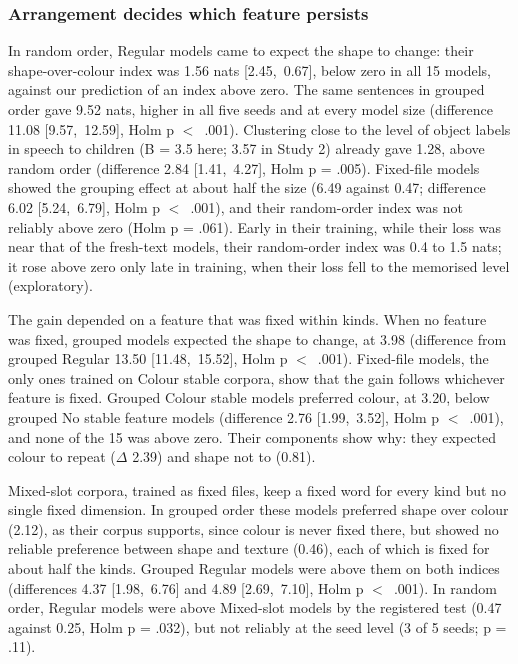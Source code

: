 \subsubsection*{Arrangement decides which feature persists}
In random order, Regular models came to expect the shape to change: their shape-over-colour index was \textminus{}1.56 nats [\textminus{}2.45,~\textminus{}0.67], below zero in all 15 models, against our prediction of an index above zero. The same sentences in grouped order gave 9.52 nats, higher in all five seeds and at every model size (difference 11.08 [9.57,~12.59], Holm p $<$~.001). Clustering close to the level of object labels in speech to children (B = 3.5 here; 3.57 in Study 2) already gave 1.28, above random order (difference 2.84 [1.41,~4.27], Holm p = .005). Fixed-file models showed the grouping effect at about half the size (6.49 against 0.47; difference 6.02 [5.24,~6.79], Holm p $<$~.001), and their random-order index was not reliably above zero (Holm p = .061). Early in their training, while their loss was near that of the fresh-text models, their random-order index was \textminus{}0.4 to \textminus{}1.5 nats; it rose above zero only late in training, when their loss fell to the memorised level (exploratory).

The gain depended on a feature that was fixed within kinds. When no feature was fixed, grouped models expected the shape to change, at \textminus{}3.98 (difference from grouped Regular 13.50 [11.48,~15.52], Holm p $<$~.001). Fixed-file models, the only ones trained on Colour stable corpora, show that the gain follows whichever feature is fixed. Grouped Colour stable models preferred colour, at \textminus{}3.20, below grouped No stable feature models (difference 2.76 [1.99,~3.52], Holm p $<$~.001), and none of the 15 was above zero. Their components show why: they expected colour to repeat ($\Delta$ 2.39) and shape not to (\textminus{}0.81).

Mixed-slot corpora, trained as fixed files, keep a fixed word for every kind but no single fixed dimension. In grouped order these models preferred shape over colour (2.12), as their corpus supports, since colour is never fixed there, but showed no reliable preference between shape and texture (0.46), each of which is fixed for about half the kinds. Grouped Regular models were above them on both indices (differences 4.37 [1.98,~6.76] and 4.89 [2.69,~7.10], Holm p $<$~.001). In random order, Regular models were above Mixed-slot models by the registered test (0.47 against \textminus{}0.25, Holm p = .032), but not reliably at the seed level (3 of 5 seeds; p = .11).

